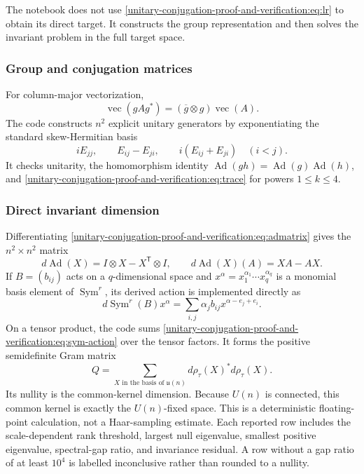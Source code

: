 \documentclass[10pt]{article}
\newcommand{\Sym}{\operatorname{Sym}}
\newcommand{\Ad}{\operatorname{Ad}}
\begin{document}
The notebook does not use \eqref{unitary-conjugation-proof-and-verification:eq:lr} to obtain its direct target.  It
constructs the group representation and then solves the invariant problem in
the full target space.

\subsubsection*{Group and conjugation matrices}
For column-major vectorization,
\begin{equation}\label{unitary-conjugation-proof-and-verification:eq:admatrix}
  \operatorname{vec}(gAg^*)=(\overline g\otimes g)\operatorname{vec}(A).
\end{equation}
The code constructs $n^2$ explicit unitary generators by exponentiating the
standard skew-Hermitian basis
\[
  iE_{jj},\qquad E_{ij}-E_{ji},\qquad i(E_{ij}+E_{ji})\quad(i<j).
\]
It checks unitarity, the homomorphism identity
$\Ad(gh)=\Ad(g)\Ad(h)$, and \eqref{unitary-conjugation-proof-and-verification:eq:trace} for powers $1\leq k\leq4$.

\subsubsection*{Direct invariant dimension}
Differentiating \eqref{unitary-conjugation-proof-and-verification:eq:admatrix} gives the $n^2\times n^2$ matrix
\begin{equation}\label{unitary-conjugation-proof-and-verification:eq:derived-ad}
  d\Ad(X)=I\otimes X-X^{\mathsf T}\otimes I,
  \qquad d\Ad(X)(A)=XA-AX.
\end{equation}
If $B=(b_{ij})$ acts on a $q$-dimensional space and
$x^\alpha=x_1^{\alpha_1}\cdots x_q^{\alpha_q}$ is a monomial basis element
of $\Sym^r$, its derived action is implemented directly as
\begin{equation}\label{unitary-conjugation-proof-and-verification:eq:sym-action}
  d\Sym^r(B)x^\alpha
  =\sum_{i,j}\alpha_j b_{ij}x^{\alpha-e_j+e_i}.
\end{equation}
On a tensor product, the code sums \eqref{unitary-conjugation-proof-and-verification:eq:sym-action} over the tensor
factors.  It forms the positive semidefinite Gram matrix
\[
  Q=\sum_{X\text{ in the basis of }\mathfrak u(n)}
  d\rho_\tau(X)^*d\rho_\tau(X).
\]
Its nullity is the common-kernel dimension.  Because $U(n)$ is connected,
this common kernel is exactly the $U(n)$-fixed space.  This is a deterministic
floating-point calculation, not a Haar-sampling estimate.  Each reported row
includes the scale-dependent rank threshold, largest null eigenvalue,
smallest positive eigenvalue, spectral-gap ratio, and invariance residual.  A
row without a gap ratio of at least $10^4$ is labelled inconclusive rather
than rounded to a nullity.
\end{document}
